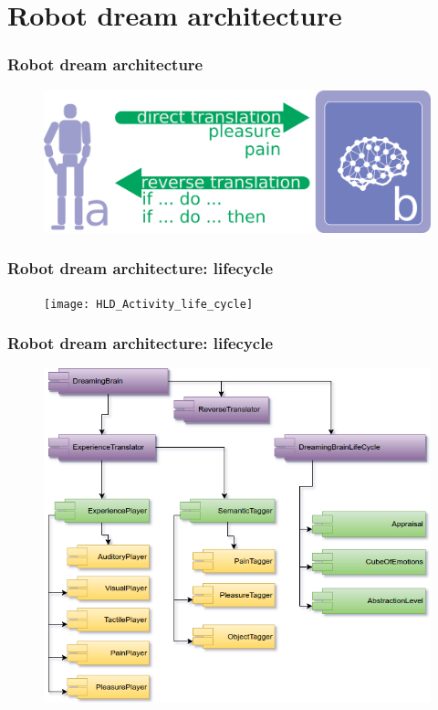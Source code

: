 \documentclass[12pt, aspectratio=169]{beamer}
\begin{document}
\section{Robot dream architecture}

\begin{frame}
\frametitle{Robot dream architecture}
\begin{figure}
\includegraphics[width=0.8\linewidth]{robot-dream_translations}
\end{figure}
\end{frame}


\begin{frame}
\frametitle{Robot dream architecture: lifecycle}
\begin{figure}
\texttt{[image: HLD\_Activity\_life\_cycle]}
\end{figure}
\end{frame}


\begin{frame}
\frametitle{Robot dream architecture: lifecycle}
\begin{figure}
\includegraphics[width=0.8\linewidth]{HLD_Component_MemristiveDreamingBrain.png}
\end{figure}
\end{frame}
\end{document}
